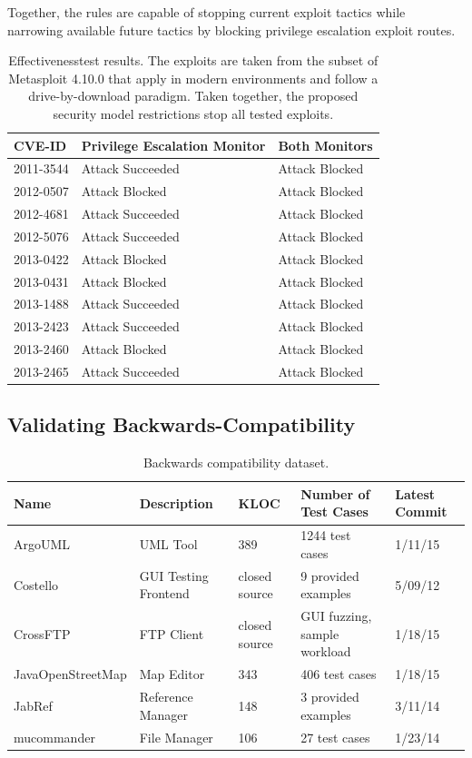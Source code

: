 \documentclass{sig-alternate}
\begin{document}
Together, the rules are capable of stopping current exploit tactics while
narrowing available future tactics by blocking privilege escalation exploit
routes.

\begin{table}
\caption{Effectiveness\label{tab:Exploit-experiment-summary} test results.  The
  exploits are taken from the subset of Metasploit 4.10.0 that apply in modern
  environments and follow a drive-by-download paradigm.
  Taken together, the proposed security model restrictions stop all tested exploits.}
\begin{tabular}{l>{\raggedright}p{3cm}l}
\toprule 
\textbf{CVE-ID} & \textbf{Privilege Escalation Monitor} & \textbf{Both Monitors}\tabularnewline
\midrule
2011-3544 & Attack Succeeded  & Attack Blocked \\
2012-0507 & Attack Blocked & Attack Blocked \\
2012-4681 & Attack Succeeded  & Attack Blocked \\
2012-5076 & Attack Succeeded  & Attack Blocked \\
2013-0422 & Attack Blocked & Attack Blocked \\
2013-0431 & Attack Blocked & Attack Blocked \\
2013-1488 & Attack Succeeded  & Attack Blocked \\
2013-2423 & Attack Succeeded  & Attack Blocked \\
2013-2460 & Attack Blocked & Attack Blocked \\
2013-2465 & Attack Succeeded  & Attack Blocked \\
\bottomrule
\end{tabular}
\end{table}

\subsection{Validating Backwards-Compatibility}\label{sec:backcompat}
\begin{table}
\caption{\label{tab:validation-programs}
Backwards compatibility dataset.}
\centering

\begin{tabular}{lllll}
\toprule 
\textbf{Name} & \textbf{Description} & \textbf{KLOC} & \textbf{Number of Test Cases} & \textbf{Latest Commit}\tabularnewline
\midrule
ArgoUML & UML Tool & 389 & 1244 test cases & 1/11/15 \tabularnewline
Costello & GUI Testing Frontend & closed source & 9 provided examples & 5/09/12 \tabularnewline
CrossFTP & FTP Client & closed source & GUI fuzzing, sample workload & 1/18/15 \tabularnewline
JavaOpenStreetMap & Map Editor & 343 & 406 test cases & 1/18/15 \tabularnewline
JabRef & Reference Manager & 148 & 3 provided examples & 3/11/14 \tabularnewline 
mucommander & File Manager & 106 & 27 test cases & 1/23/14 \tabularnewline
\bottomrule
\end{tabular}
\vspace{-0.5cm}
\end{table}
\end{document}
